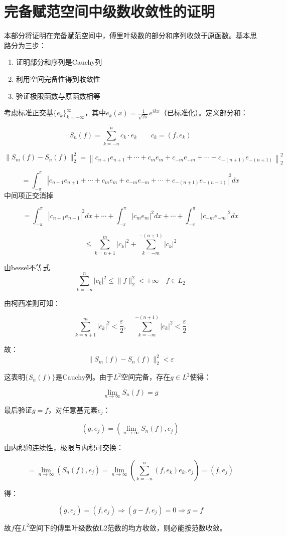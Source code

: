 \documentclass[linespread=1.5]{article}
\begin{document}
	\section{完备赋范空间中级数收敛性的证明}
	
	本部分将证明在完备赋范空间中，傅里叶级数的部分和序列收敛于原函数。基本思路分为三步：
	\begin{enumerate}
		\item 证明部分和序列是Cauchy列
		\item 利用空间完备性得到收敛性
		\item 验证极限函数与原函数相等
	\end{enumerate}
	
	考虑标准正交基$\{e_k\}_{k=-\infty}^\infty$，其中$e_k(x) = \frac{1}{\sqrt{2\pi}}e^{ikx}$（已标准化）。定义部分和：
	

		\[
	S_n(f) = \sum_{k=-n}^n c_k \cdot e_k \quad \quad c_k = (f, e_k)
	\]
	
	\[
	\| S_m(f) - S_n(f) \|_2^2 = \left\| c_{n+1} e_{n+1} + \cdots + c_m e_m + c_{-m} e_{-m} + \cdots + c_{-(n+1)} e_{-(n+1)} \right\|_2^2
	\]
	
	\[
	= \int_{-\pi}^\pi \left| c_{n+1} e_{n+1} + \cdots + c_m e_m + c_{-m} e_{-m} + \cdots + c_{-(n+1)} e_{-(n+1)} \right|^2 dx
	\]
	中间项正交消掉
	
	\[
	= \int_{-\pi}^\pi |c_{n+1} e_{n+1}|^2 dx + \cdots + \int_{-\pi}^\pi |c_m e_m|^2 dx + \cdots + \int_{-\pi}^\pi |c_{-m} e_{-m}|^2 dx
	\]
	
	\[
	\leq \sum_{k=n+1}^m  |c_k|^2 + \sum_{k=-m}^{-(n+1)} |c_k|^2
	\]
	
	由bessel不等式
	\[
 \sum_{k=-n}^n |c_k|^2 \leq \|f\|_2^2 < +\infty \quad f \in L_2
	\]
	
	由柯西准则可知：
	
	\[
	\sum_{k=n+1}^m |c_k|^2 < \frac{\varepsilon}{2}, \quad \sum_{k=-m}^{-(n+1)} |c_k|^2 < \frac{\varepsilon}{2}
	\]
	
	故：
	\[
	\| S_m(f) - S_n(f) \|_2^2 < \varepsilon 
	\]
	
	这表明$\{S_n(f)\}$是Cauchy列。由于$L^2$空间完备，存在$g \in L^2$使得：

\[
\lim_{n \to \infty} S_n(f) = g
\]
	

最后验证$g = f$，对任意基元素$e_j$：
	
	\[
	(g, e_j) = \left( \lim_{n \to \infty} S_n(f), e_j \right)
	\]
	
	由内积的连续性，极限与内积可交换：
	
	\[
	= \lim_{n \to \infty} (S_n(f), e_j) = \lim_{n \to \infty} \left( \sum_{k=-n}^n (f, e_k) e_k, e_j \right) = (f, e_j)
	\]
	
	得：
	
	\[
	(g, e_j) = (f, e_j) \Rightarrow (g - f, e_j) = 0 \Rightarrow g = f
	\]
	
	故$f$在$L^2$空间下的傅里叶级数依L2范数的均方收敛，则必能按范数收敛。
	


	
\end{document}
